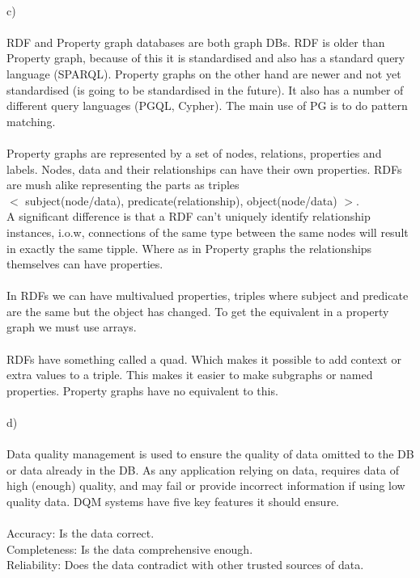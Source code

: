 \documentclass[12pt, letterpaper, twoside]{article}
\begin{document}
\ \\
c)\\
\ \\
RDF and Property graph databases are both graph DBs. RDF is older than Property graph, because of this it is standardised and also has a standard query language (SPARQL). Property graphs on the other hand are newer and not yet standardised (is going to be standardised in the future). It also has a number of different query languages (PGQL, Cypher). The main use of PG is to do pattern matching.\\
\newpage
\ \\
Property graphs are represented by a set of nodes, relations, properties and labels. Nodes, data and their relationships can have their own properties. RDFs are mush alike representing the parts as triples\\
$<$ subject(node/data), predicate(relationship), object(node/data) $>$.\\
A significant difference is that a RDF can't uniquely identify relationship instances, i.o.w, connections of the same type between the same nodes will result in exactly the same tipple. Where as in Property graphs the relationships themselves can have properties.\\
\ \\
In RDFs we can have multivalued properties, triples where subject and predicate are the same but the object has changed. To get the equivalent in a property graph we must use arrays.\\
\ \\
RDFs have something called a quad. Which makes it possible to add context or extra values to a triple. This makes it easier to make subgraphs or named properties. Property graphs have no equivalent to this.
\\
\ \\
d)\\
\ \\
Data quality management is used to ensure the quality of data omitted to the DB or data already in the DB. As any application relying on data, requires data of high (enough) quality, and may fail or provide incorrect information if using low quality data. DQM systems have five key features it should ensure.\\
\ \\
Accuracy: Is the data correct.\\
Completeness: Is the data comprehensive enough.\\
Reliability: Does the data contradict with other trusted sources of data.\\
\end{document}
